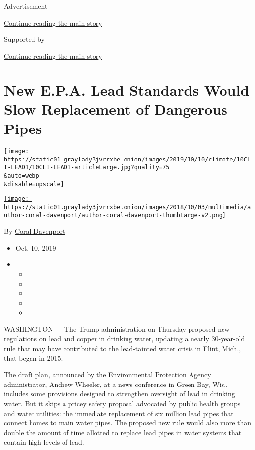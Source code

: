 Advertisement

\protect\hyperlink{after-top}{Continue reading the main story}

Supported by

\protect\hyperlink{after-sponsor}{Continue reading the main story}

\hypertarget{new-epa-lead-standards-would-slow-replacement-of-dangerous-pipes}{%
\section{New E.P.A. Lead Standards Would Slow Replacement of Dangerous
Pipes}\label{new-epa-lead-standards-would-slow-replacement-of-dangerous-pipes}}

\texttt{[image: https://static01.graylady3jvrrxbe.onion/images/2019/10/10/climate/10CLI-LEAD1/10CLI-LEAD1-articleLarge.jpg?quality=75\\\&auto=webp\\\&disable=upscale]}

\href{https://www.nytimes3xbfgragh.onion/by/coral-davenport}{\texttt{[image: https://static01.graylady3jvrrxbe.onion/images/2018/10/03/multimedia/author-coral-davenport/author-coral-davenport-thumbLarge-v2.png]}}

By \href{https://www.nytimes3xbfgragh.onion/by/coral-davenport}{Coral
Davenport}

\begin{itemize}
\item
  Oct. 10, 2019
\item
  \begin{itemize}
  \item
  \item
  \item
  \item
  \item
  \end{itemize}
\end{itemize}

WASHINGTON --- The Trump administration on Thursday proposed new
regulations on lead and copper in drinking water, updating a nearly
30-year-old rule that may have contributed to the
\href{https://www.nytimes3xbfgragh.onion/interactive/2016/01/21/us/flint-lead-water-timeline.html?module=inline}{lead-tainted
water crisis in Flint, Mich.}, that began in 2015.

The draft plan, announced by the Environmental Protection Agency
administrator, Andrew Wheeler, at a news conference in Green Bay, Wis.,
includes some provisions designed to strengthen oversight of lead in
drinking water. But it skips a pricey safety proposal advocated by
public health groups and water utilities: the immediate replacement of
six million lead pipes that connect homes to main water pipes. The
proposed new rule would also more than double the amount of time
allotted to replace lead pipes in water systems that contain high levels
of lead.

